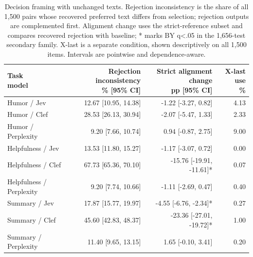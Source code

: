 \begin{table}[t]
\centering\footnotesize
\setlength{\tabcolsep}{3.5pt}
\begin{tabular}{@{}lrrr@{}}
\toprule
\shortstack[l]{Task\\{}model} & \shortstack[l]{Rejection inconsistency\\{}\% [95\% CI]} & \shortstack[l]{Strict alignment change\\{}pp [95\% CI]} & \shortstack[l]{X-last use\\{}\%} \\
\midrule
Humor / Jev & 12.67 [10.95, 14.38] & -1.22 [-3.27, 0.82] & 4.13 \\
Humor / Clef & 28.53 [26.13, 30.94] & -2.07 [-5.47, 1.33] & 2.33 \\
Humor / Perplexity & 9.20 [7.66, 10.74] & 0.94 [-0.87, 2.75] & 9.00 \\
Helpfulness / Jev & 13.53 [11.80, 15.27] & -1.17 [-3.07, 0.72] & 0.00 \\
Helpfulness / Clef & 67.73 [65.36, 70.10] & -15.76 [-19.91, -11.61]* & 0.07 \\
Helpfulness / Perplexity & 9.20 [7.74, 10.66] & -1.11 [-2.69, 0.47] & 0.40 \\
Summary / Jev & 17.87 [15.77, 19.97] & -4.55 [-6.76, -2.34]* & 0.27 \\
Summary / Clef & 45.60 [42.83, 48.37] & -23.36 [-27.01, -19.72]* & 1.00 \\
Summary / Perplexity & 11.40 [9.65, 13.15] & 1.65 [-0.10, 3.41] & 0.20 \\
\bottomrule
\end{tabular}
\caption{Decision framing with unchanged texts. Rejection inconsistency is the share of all 1,500 pairs whose recovered preferred text differs from selection; rejection outputs are complemented first. Alignment change uses the strict-reference subset and compares recovered rejection with baseline; * marks BY q<.05 in the 1,656-test secondary family. X-last is a separate condition, shown descriptively on all 1,500 items. Intervals are pointwise and dependence-aware.}
\label{tab:results_framing}
\end{table}
